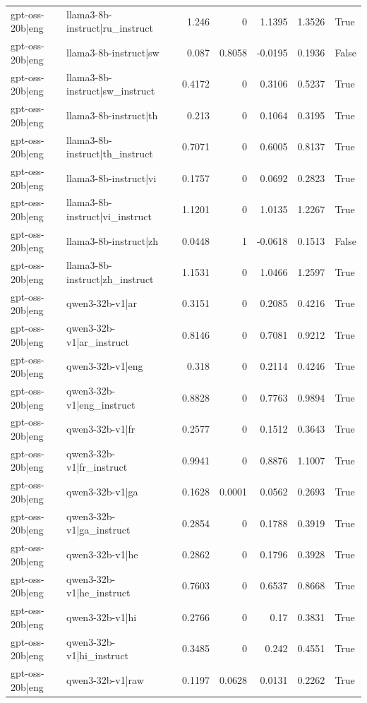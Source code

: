 \begin{table}
\begin{tabular}{l l r r r r l}
gpt-oss-20b|eng & llama3-8b-instruct|ru_instruct & 1.246 & 0 & 1.1395 & 1.3526 & True \\
gpt-oss-20b|eng & llama3-8b-instruct|sw & 0.087 & 0.8058 & -0.0195 & 0.1936 & False \\
gpt-oss-20b|eng & llama3-8b-instruct|sw_instruct & 0.4172 & 0 & 0.3106 & 0.5237 & True \\
gpt-oss-20b|eng & llama3-8b-instruct|th & 0.213 & 0 & 0.1064 & 0.3195 & True \\
gpt-oss-20b|eng & llama3-8b-instruct|th_instruct & 0.7071 & 0 & 0.6005 & 0.8137 & True \\
gpt-oss-20b|eng & llama3-8b-instruct|vi & 0.1757 & 0 & 0.0692 & 0.2823 & True \\
gpt-oss-20b|eng & llama3-8b-instruct|vi_instruct & 1.1201 & 0 & 1.0135 & 1.2267 & True \\
gpt-oss-20b|eng & llama3-8b-instruct|zh & 0.0448 & 1 & -0.0618 & 0.1513 & False \\
gpt-oss-20b|eng & llama3-8b-instruct|zh_instruct & 1.1531 & 0 & 1.0466 & 1.2597 & True \\
gpt-oss-20b|eng & qwen3-32b-v1|ar & 0.3151 & 0 & 0.2085 & 0.4216 & True \\
gpt-oss-20b|eng & qwen3-32b-v1|ar_instruct & 0.8146 & 0 & 0.7081 & 0.9212 & True \\
gpt-oss-20b|eng & qwen3-32b-v1|eng & 0.318 & 0 & 0.2114 & 0.4246 & True \\
gpt-oss-20b|eng & qwen3-32b-v1|eng_instruct & 0.8828 & 0 & 0.7763 & 0.9894 & True \\
gpt-oss-20b|eng & qwen3-32b-v1|fr & 0.2577 & 0 & 0.1512 & 0.3643 & True \\
gpt-oss-20b|eng & qwen3-32b-v1|fr_instruct & 0.9941 & 0 & 0.8876 & 1.1007 & True \\
gpt-oss-20b|eng & qwen3-32b-v1|ga & 0.1628 & 0.0001 & 0.0562 & 0.2693 & True \\
gpt-oss-20b|eng & qwen3-32b-v1|ga_instruct & 0.2854 & 0 & 0.1788 & 0.3919 & True \\
gpt-oss-20b|eng & qwen3-32b-v1|he & 0.2862 & 0 & 0.1796 & 0.3928 & True \\
gpt-oss-20b|eng & qwen3-32b-v1|he_instruct & 0.7603 & 0 & 0.6537 & 0.8668 & True \\
gpt-oss-20b|eng & qwen3-32b-v1|hi & 0.2766 & 0 & 0.17 & 0.3831 & True \\
gpt-oss-20b|eng & qwen3-32b-v1|hi_instruct & 0.3485 & 0 & 0.242 & 0.4551 & True \\
gpt-oss-20b|eng & qwen3-32b-v1|raw & 0.1197 & 0.0628 & 0.0131 & 0.2262 & True \\

\end{tabular}
\end{table}
